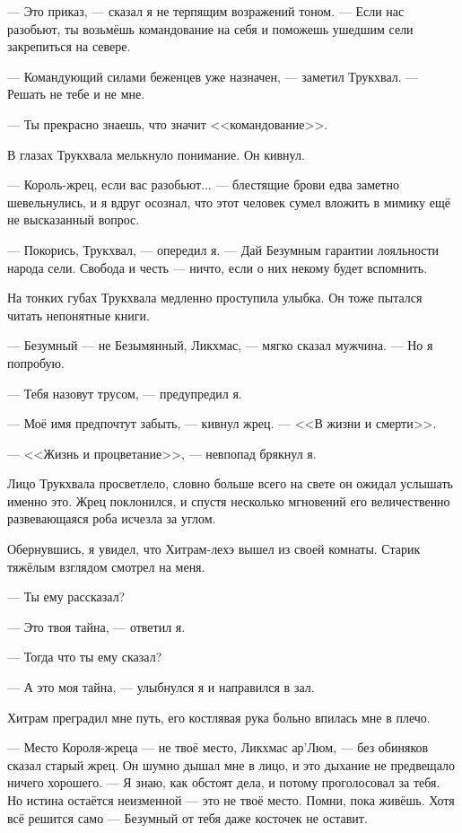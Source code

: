--- Это приказ, --- сказал я не терпящим возражений тоном.
--- Если нас разобьют, ты возьмёшь командование на себя и поможешь ушедшим сели закрепиться на севере.

--- Командующий силами беженцев уже назначен, --- заметил Трукхвал.
--- Решать не тебе и не мне.

--- Ты прекрасно знаешь, что значит <<командование>>.

В глазах Трукхвала мелькнуло понимание.
Он кивнул.

--- Король-жрец, если вас разобьют... --- блестящие брови едва заметно шевельнулись, и я вдруг осознал, что этот человек сумел вложить в мимику ещё не высказанный вопрос.

--- Покорись, Трукхвал, --- опередил я.
--- Дай Безумным гарантии лояльности народа сели.
Свобода и честь --- ничто, если о них некому будет вспомнить.

На тонких губах Трукхвала медленно проступила улыбка.
Он тоже пытался читать непонятные книги.

--- Безумный --- не Безымянный, Ликхмас, --- мягко сказал мужчина.
--- Но я попробую.

--- Тебя назовут трусом, --- предупредил я.

--- Моё имя предпочтут забыть, --- кивнул жрец.
--- <<В жизни и смерти>>.

--- <<Жизнь и процветание>>, --- невпопад брякнул я.

Лицо Трукхвала просветлело, словно больше всего на свете он ожидал услышать именно это.
Жрец поклонился, и спустя несколько мгновений его величественно развевающаяся роба исчезла за углом.

Обернувшись, я увидел, что Хитрам-лехэ вышел из своей комнаты.
Старик тяжёлым взглядом смотрел на меня.

--- Ты ему рассказал?

--- Это твоя тайна, --- ответил я.

--- Тогда что ты ему сказал?

--- А это моя тайна, --- улыбнулся я и направился в зал.

Хитрам преградил мне путь, его костлявая рука больно впилась мне в плечо.

--- Место Короля-жреца --- не твоё место, Ликхмас ар’Люм, --- без обиняков сказал старый жрец.
Он шумно дышал мне в лицо, и это дыхание не предвещало ничего хорошего.
--- Я знаю, как обстоят дела, и потому проголосовал за тебя.
Но истина остаётся неизменной --- это не твоё место.
Помни, пока живёшь.
Хотя всё решится само --- Безумный от тебя даже косточек не оставит.

